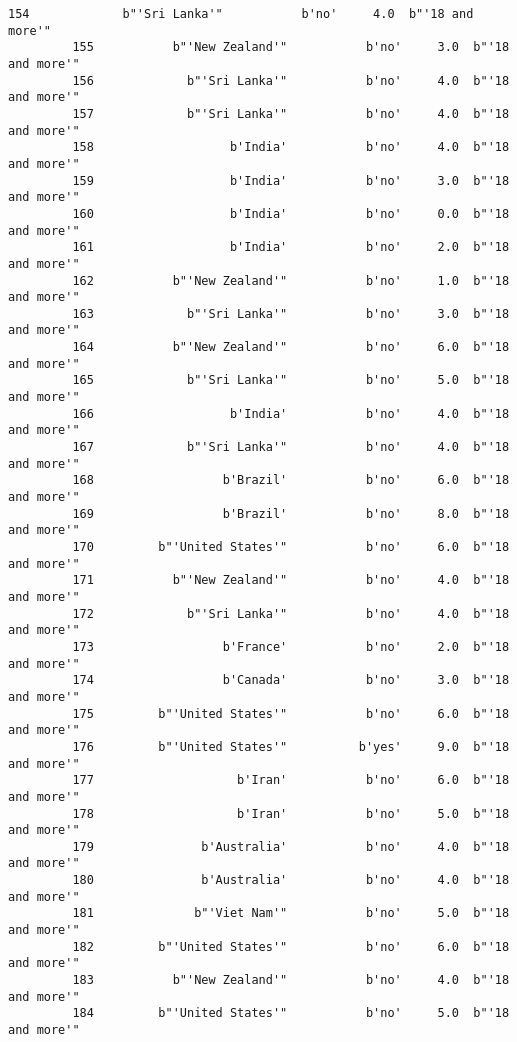 \documentclass[11pt]{article}
\begin{document}
\begin{Verbatim}[commandchars=\\\{\}]
         154             b"'Sri Lanka'"           b'no'     4.0  b"'18 and more'"   
         155           b"'New Zealand'"           b'no'     3.0  b"'18 and more'"   
         156             b"'Sri Lanka'"           b'no'     4.0  b"'18 and more'"   
         157             b"'Sri Lanka'"           b'no'     4.0  b"'18 and more'"   
         158                   b'India'           b'no'     4.0  b"'18 and more'"   
         159                   b'India'           b'no'     3.0  b"'18 and more'"   
         160                   b'India'           b'no'     0.0  b"'18 and more'"   
         161                   b'India'           b'no'     2.0  b"'18 and more'"   
         162           b"'New Zealand'"           b'no'     1.0  b"'18 and more'"   
         163             b"'Sri Lanka'"           b'no'     3.0  b"'18 and more'"   
         164           b"'New Zealand'"           b'no'     6.0  b"'18 and more'"   
         165             b"'Sri Lanka'"           b'no'     5.0  b"'18 and more'"   
         166                   b'India'           b'no'     4.0  b"'18 and more'"   
         167             b"'Sri Lanka'"           b'no'     4.0  b"'18 and more'"   
         168                  b'Brazil'           b'no'     6.0  b"'18 and more'"   
         169                  b'Brazil'           b'no'     8.0  b"'18 and more'"   
         170         b"'United States'"           b'no'     6.0  b"'18 and more'"   
         171           b"'New Zealand'"           b'no'     4.0  b"'18 and more'"   
         172             b"'Sri Lanka'"           b'no'     4.0  b"'18 and more'"   
         173                  b'France'           b'no'     2.0  b"'18 and more'"   
         174                  b'Canada'           b'no'     3.0  b"'18 and more'"   
         175         b"'United States'"           b'no'     6.0  b"'18 and more'"   
         176         b"'United States'"          b'yes'     9.0  b"'18 and more'"   
         177                    b'Iran'           b'no'     6.0  b"'18 and more'"   
         178                    b'Iran'           b'no'     5.0  b"'18 and more'"   
         179               b'Australia'           b'no'     4.0  b"'18 and more'"   
         180               b'Australia'           b'no'     4.0  b"'18 and more'"   
         181              b"'Viet Nam'"           b'no'     5.0  b"'18 and more'"   
         182         b"'United States'"           b'no'     6.0  b"'18 and more'"   
         183           b"'New Zealand'"           b'no'     4.0  b"'18 and more'"   
         184         b"'United States'"           b'no'     5.0  b"'18 and more'"   

\end{Verbatim}
\end{document}
